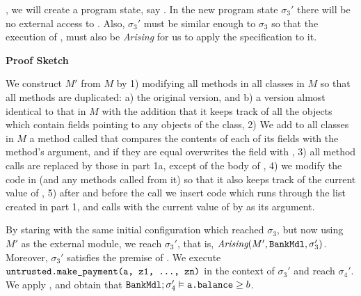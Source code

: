 , we will   create 
a program state, say . In the new program state $\sigma_3'$ there will be no external access to . 
Also, $\sigma_3'$  must be similar enough to 
$\sigma_3$ so  that the execution of  
   , must also be \textit{Arising} for us to apply the \Nec specification 
\SrobustB to it.


\vspace{.1in}

\noindent
{\bf{Proof Sketch}}

\noindent
We construct $M'$ from $M$ by 1) modifying  all methods in all 
classes in $M$  so that all methods are duplicated: a) the original version, and b) 
a version almost identical  to that in $M$ with the addition that it keeps track of all the objects which contain fields pointing to
any objects of the  class, 
2) We add to all classes in $M$ a method called 
that compares the contents of each of its fields with the method's argument, and if they are
equal overwrites the field with , 
3) all method calls  are replaced by those in part 1a, except of the body of ,
4) we modify the code in  (and any methods called from it) so that it also keeps track of the current value of
, 
5) after  and before the call  we insert  code which
runs through the list created in part 1, and calls  with the current value of  by  as its argument.

By staring with the same initial configuration which reached $\sigma_3$,
 but now using $M'$ as the external module, we reach $\sigma_3'$, 
that is, $\textit{Arising}(M', {\texttt{BankMdl}}, \sigma_3')$. Moreover,  $\sigma_3'$ 
satisfies the premise of  \SrobustB. 
We execute ${\texttt{untrusted}}{\texttt{.make\_payment}}{\texttt{(a, z1, ..., zn)}}$ in the context of   $\sigma_3'$ 
and reach $\sigma_4'$. We apply  \SrobustB, and obtain that ${\texttt{BankMdl}};\sigma_4' \vDash {\texttt{a.balance}} \geq b$.

